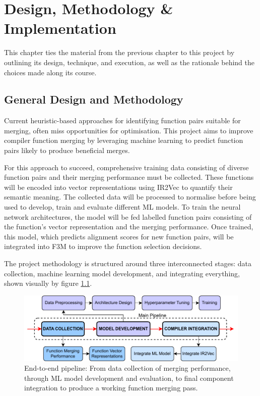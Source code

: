 \chapter{Design, Methodology \& Implementation}
This chapter ties the material from the previous chapter to this project by outlining its design, technique, and execution, as well as the rationale behind the choices made along its course.

\section{General Design and Methodology} \label{Design:GeneralDesign}
Current heuristic-based approaches for identifying function pairs suitable for merging, often miss opportunities for optimisation. This project aims to improve compiler function merging by leveraging machine learning to predict function pairs likely to produce beneficial merges.

For this approach to succeed, comprehensive training data consisting of diverse function pairs and their merging performance must be collected. These functions will be encoded into vector representations using IR2Vec to quantify their semantic meaning. The collected data will be processed to normalise before being used to develop, train and evaluate different ML models. To train the neural network architectures, the model will be fed labelled function pairs consisting of the function's vector representation and the merging performance. Once trained, this model, which predicts alignment scores for new function pairs, will be integrated into F3M to improve the function selection decisions.

The project methodology is structured around three interconnected stages: data collection, machine learning model development, and integrating everything, shown visually by figure \ref{fig:ProjectPipeline}.

\begin{figure}[tbh!]
\centering
\includegraphics[scale=1]{Figures/ProjectPipeline.drawio.pdf}
\caption{End-to-end pipeline: From data collection of merging performance, through ML model development and evaluation, to final component integration to produce a working function merging pass.}\label{fig:ProjectPipeline}
\end{figure}

